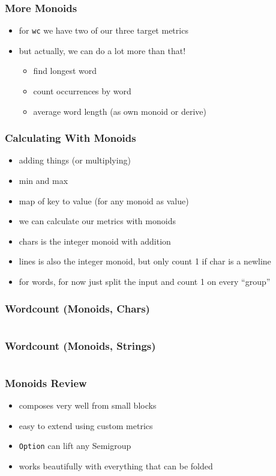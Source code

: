 \documentclass[aspectratio=169]{beamer}
\begin{document}
\begin{frame}
  \frametitle{More Monoids}
  \begin{itemize}
  \item for \texttt{wc} we have two of our three target metrics
  \item but actually, we can do a lot more than that!
    \begin{itemize}
    \item find longest word
    \item count occurrences by word
    \item average word length (as own monoid or derive)
    \end{itemize}
  \end{itemize}
\end{frame}

\begin{frame}
  \frametitle{Calculating With Monoids}
  \begin{itemize}
  \item adding things (or multiplying)
  \item min and max
  \item map of key to value (for any monoid as value)
  \item we can calculate our metrics with monoids
  \item chars is the integer monoid with addition
  \item lines is also the integer monoid, but only count 1 if char is a newline
  \item for words, for now just split the input and count 1 on every ``group''
  \end{itemize}
\end{frame}

\begin{frame}
  \frametitle{Wordcount (Monoids, Chars)}
  \inputminted[fontsize=\footnotesize]{scala}{snippets/wc-monoid-char.scala}
\end{frame}

\begin{frame}
  \frametitle{Wordcount (Monoids, Strings)}
  \inputminted[fontsize=\footnotesize]{scala}{snippets/wc-monoid-string.scala}
\end{frame}

\begin{frame}
  \frametitle{Monoids \textemdash{} Review}
  \begin{itemize}
  \item composes very well from small blocks
  \item easy to extend using custom metrics
  \item \texttt{Option} can lift any Semigroup
  \item works beautifully with everything that can be folded
  \end{itemize}
\end{frame}
\end{document}
